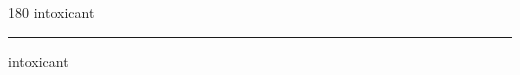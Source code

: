 
\begin{frame}
\begin{center}
\begin{turn}{180}
{\fontsize{2.5cm}{1em}\selectfont intoxicant}
\end{turn}
\vspace{1em}\par  
\hrule
\vspace{1em}\par  
{\fontsize{2.5cm}{1em}\selectfont intoxicant}
\end{center}
\end{frame}

